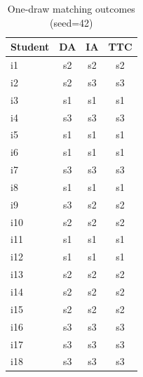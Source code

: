 \begin{table}[H]
\centering
\caption{One-draw matching outcomes (seed=42)}
\label{tab:matching_seed42}
\begin{tabular}{lccc}
\hline
Student & DA & IA & TTC \\
\hline
i1 & s2 & s2 & s2 \\
i2 & s2 & s3 & s3 \\
i3 & s1 & s1 & s1 \\
i4 & s3 & s3 & s3 \\
i5 & s1 & s1 & s1 \\
i6 & s1 & s1 & s1 \\
i7 & s3 & s3 & s3 \\
i8 & s1 & s1 & s1 \\
i9 & s3 & s2 & s2 \\
i10 & s2 & s2 & s2 \\
i11 & s1 & s1 & s1 \\
i12 & s1 & s1 & s1 \\
i13 & s2 & s2 & s2 \\
i14 & s2 & s2 & s2 \\
i15 & s2 & s2 & s2 \\
i16 & s3 & s3 & s3 \\
i17 & s3 & s3 & s3 \\
i18 & s3 & s3 & s3 \\
\hline
\end{tabular}
\end{table}